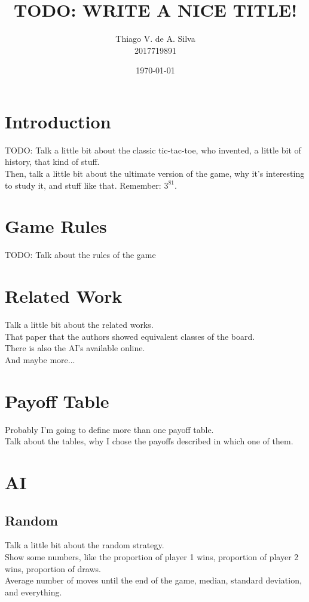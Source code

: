 \documentclass[10pt]{article}
\title{\textbf{TODO: WRITE A NICE TITLE!}}
\author{Thiago V. de A. Silva\\2017719891}
\date{\today}
\begin{document}
\maketitle

\section{Introduction}

TODO: Talk a little bit about the classic tic-tac-toe, who invented, a little bit of history, that kind of stuff.\\

Then, talk a little bit about the ultimate version of the game, why it's interesting to study it, and stuff like that.
Remember: $3^{81}$.

\section{Game Rules}
TODO: Talk about the rules of the game



\section{Related Work}
Talk a little bit about the related works.\\
That paper that the authors showed equivalent classes of the board.\\
There is also the AI's available online.\\
And maybe more...



\section{Payoff Table}
Probably I'm going to define more than one payoff table.\\
Talk about the tables, why I chose the payoffs described in which one of them.



\section{AI}
\subsection{Random}
Talk a little bit about the random strategy.\\
Show some numbers, like the proportion of player 1 wins, proportion of player 2 wins, proportion of draws.\\
Average number of moves until the end of the game, median, standard deviation, and everything.
\end{document}
